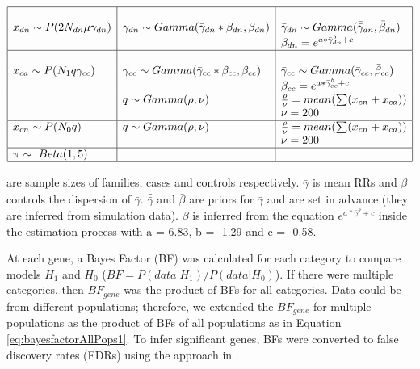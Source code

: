 \documentclass[]{article}
\begin{document}
\begin{table}[H]
\[
\begin{array}{|l|l|l|}
\hline
 & & \\
x_{dn} \sim P(2N_{dn}\mu  \gamma_{dn}) & \gamma_{dn} \sim
                                         Gamma(\bar{\gamma}_{dn}*\beta_{dn},\beta_{dn})
  & \bar{\gamma}_{dn} \sim Gamma(\bar{\bar{\gamma}}_{dn}, \bar{\beta}_{dn}) \\
& & \beta_{dn} = e^{a*\bar{\gamma}_{dn}^b + c} \\

\hline
& & \\
x_{ca} \sim P(N_{1} q  \gamma_{cc}) & \gamma_{cc} \sim
                                      Gamma(\bar{\gamma}_{cc}*\beta_{cc},
                                      \beta_{cc})
& \bar{\gamma}_{cc} \sim Gamma(\bar{\bar{\gamma}}_{cc}, \bar{\beta}_{cc}) \\
& & \beta_{cc} = e^{a*\bar{\gamma}_{cc}^b + c} \\

& q \sim Gamma(\rho, \nu) & \frac{\rho}{\nu} = mean(\sum(x_{cn} + x_{ca})) \\
& &                    \nu  = 200 \\

\hline
x_{cn} \sim P(N_{0} q) & q \sim Gamma(\rho, \nu)  & \frac{\rho}{\nu} =
                                                    mean(\sum(x_{cn} +
                                                    x_{ca})) \\
& & \nu = 200 \\
\hline
\pi \sim~ Beta(1, 5) &  & \\
\hline
\end{array}
\]

\caption{Parameter information used in all analyses. $N_{dn}, N_1,
  N_0$} are sample sizes of families, cases and controls
respectively. $\bar{\gamma}$ is mean RRs and $\beta$ controls the
dispersion of $\bar{\gamma}$. $\bar{\bar{\gamma}}$ and $\bar{\bar{\beta}}$ are
priors for $\bar{\gamma}$ and are set in advance (they are inferred
from simulation data). $\beta$ is inferred
from the equation $ e^{a*\bar{\gamma}^b + c}$ inside the
estimation process with  a = 6.83, b =
-1.29 and c = -0.58.
\label{tab:ParameterModelleing}
\end{table}



At each gene, a Bayes Factor (BF) was calculated for each category to
compare models $H_1$ and $H_0$ ($BF=P(data|H_1)/P(data|H_0)$). If
there were multiple categories, then $BF_{gene}$ was the product of BFs
for all categories. Data could be from different populations; therefore,
we extended the $BF_{gene}$ for multiple populations as the product of
BFs of all populations as in Equation \ref{eq:bayesfactorAllPops1}. To infer significant genes, BFs were converted to false discovery
rates (FDRs) using the approach in \cite{newton2004detecting}.
\end{document}
